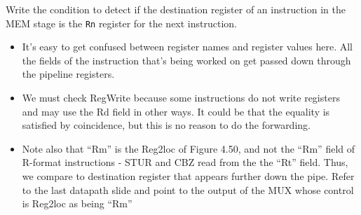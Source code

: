 \begin{frame}[fragile]
 
 \begin{tcolorbox}[enhanced,attach boxed title to top center={yshift=-3mm,yshifttext=-1mm},
  colback=red!5!white,colframe=red!75!black,colbacktitle=red!80!black,
  title=Try this,fonttitle=\bfseries,
  boxed title style={size=small,colframe=red!50!black} ]
Write the condition to detect if the destination register of an instruction in the MEM stage is the {\tt Rn} register for the next instruction.

\ifnum{}\fi
  \end{tcolorbox}

\BNotes\ifnum{}
\begin{itemize}
\item
It's easy to get confused between register names and register values
here. All the fields of the instruction that's being worked on get
passed down through the pipeline registers. 
\item 
We must check RegWrite because some instructions do not write
registers and may use the Rd field in other ways. It could be that the
equality is satisfied by coincidence, but this is no reason to do the
forwarding. 
\item Note also that ``Rm'' is the Reg2loc of Figure 4.50, and not the
``Rm'' field of R-format instructions - STUR and CBZ read from the 
the ``Rt'' field.  Thus, we compare to destination register that appears
further down the pipe.  Refer to the last datapath slide and point to
the output of the MUX whose control is Reg2loc as being ``Rm''
\end{itemize}
\fi\ENotes
\end{frame}

